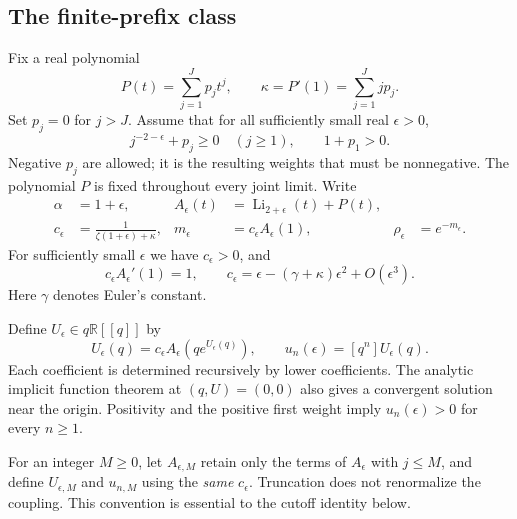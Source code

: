 \documentclass[11pt,a4paper]{article}
\numberwithin{equation}{section}
\theoremstyle{definition}
\theoremstyle{remark}
\newcommand{\R}{\mathbb R}
\newcommand{\ee}{\epsilon}
\DeclareMathOperator{\Li}{Li}
\begin{document}
\subsection{The finite-prefix class}
Fix a real polynomial
\begin{equation}\label{eq:prefix}
 P(t)=\sum_{j=1}^{J}p_jt^j,
 \qquad \kappa=P'(1)=\sum_{j=1}^{J}jp_j.
\end{equation}
Set $p_j=0$ for $j>J$. Assume that for all sufficiently small real
$\ee>0$,
\begin{equation}\label{eq:positivity}
 j^{-2-\ee}+p_j\ge0\quad(j\ge1),\qquad 1+p_1>0.
\end{equation}
Negative $p_j$ are allowed; it is the resulting weights that must be
nonnegative. The polynomial $P$ is fixed throughout every joint limit.
Write
\begin{align}
 \alpha&=1+\ee,&
 A_\ee(t)&=\Li_{2+\ee}(t)+P(t),\label{eq:A}\\
 c_\ee&=\frac1{\zeta(1+\ee)+\kappa},&
 m_\ee&=c_\ee A_\ee(1),&
 \rho_\ee&=e^{-m_\ee}.\label{eq:c}
\end{align}
For sufficiently small $\ee$ we have $c_\ee>0$, and
\begin{equation}\label{eq:criticalmean}
 c_\ee A_\ee'(1)=1,\qquad
 c_\ee=\ee-(\gamma+\kappa)\ee^2+O(\ee^3).
\end{equation}
Here $\gamma$ denotes Euler's constant.

Define $U_\ee\in q\R[[q]]$ by
\begin{equation}\label{eq:feedback}
 U_\ee(q)=c_\ee A_\ee(qe^{U_\ee(q)}),\qquad
 u_n(\ee)=[q^n]U_\ee(q).
\end{equation}
Each coefficient is determined recursively by lower coefficients. The
analytic implicit function theorem at $(q,U)=(0,0)$ also gives a
convergent solution near the origin. Positivity and the positive first
weight imply $u_n(\ee)>0$ for every $n\ge1$.

For an integer $M\ge0$, let $A_{\ee,M}$ retain only the terms of $A_\ee$
with $j\le M$, and define $U_{\ee,M}$ and $u_{n,M}$ using the \emph{same}
$c_\ee$. Truncation does not renormalize the coupling. This convention is
essential to the cutoff identity below.
\end{document}
